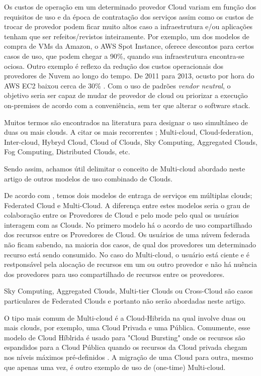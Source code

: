 \documentclass[12pt]{article}
\begin{document}
	Os custos de operação em um determinado provedor Cloud variam em função dos requisitos de uso e da época de contratação dos serviços assim como os custos de trocar de provedor podem ficar muito altos caso a infraestrutura e/ou aplicações tenham que ser refeitos/revistos inteiramente. Por exemplo, um dos modelos de compra de VMs da Amazon, o AWS Spot Instance, oferece descontos para certos casos de uso, que podem chegar a 90\%, quando sua infraestrutura encontra-se ociosa. Outro exemplo é reflexo da redução dos custos operacionais dos provedores de Nuvem ao longo do tempo. De 2011 para 2013, ocusto por hora do AWS EC2 baixou cerca de 30\% \cite{Golden:2013}. Com o uso de padrões \textit{vendor neutral}, o objetivo seria ser capaz de mudar de provedor de cloud ou priorizar a execução on-premises de acordo com a conveniência, sem ter que alterar o software stack.
	
	Muitos termos são encontrados na literatura para designar o uso simultâneo de duas ou mais clouds. A citar os mais recorrentes \cite{Ferrer:2012}; Multi-cloud, Cloud-federation, Inter-cloud, Hybryd Cloud, Cloud of Clouds, Sky Computing, Aggregated Clouds, Fog Computing, Distributed Clouds, etc.
	
	Sendo assim, achamos útil delimitar o conceito de Multi-cloud abordado neste artigo de outros modelos de uso combinado de Clouds.
	
	De acordo com \cite{Ferrer:2012}, temos dois modelos de entraga de serviços em múltiplas clouds; Federated Cloud e Multi-Cloud. A diferença entre estes modelos seria o grau de colaboração entre os Provedores de Cloud e pelo mode pelo qual os usuários interagem com as Clouds. No primero modelo há o acordo de uso compartilhado dos recursos entre os Provedores de Cloud. Os usuários de uma núvem federada não ficam sabendo, na maioria dos casos, de qual dos provedores um determinado recurso está sendo consumido. No caso do Multi-cloud, o usuário está ciente e é restponsável pela alocação de recursos em um ou outro provedor e não há nuência dos provedores para uso compartilhado de recursos entre os provedores.
	
	Sky Computing, Aggregated Clouds, Multi-tier Clouds ou Cross-Cloud são casos particulares de Federated Clouds e portanto não serão abordadas neste artigo. 
	
	O tipo mais comum de Multi-cloud é a Cloud-Hibrida na qual involve duas ou mais clouds, por exemplo, uma Cloud Privada e uma Pública. Comumente, esse modelo de Cloud Híblrida é usado para "Cloud Bursting" onde os recursos são espandidos para a Cloud Pública quando os recursos da Cloud privada chegam nos níveis máximos pré-definidos \cite{Ferrer:2012}. A migração de uma Cloud para outra, mesmo que apenas uma vez, é outro exemplo de uso de (one-time) Multi-cloud.
	
\end{document}
